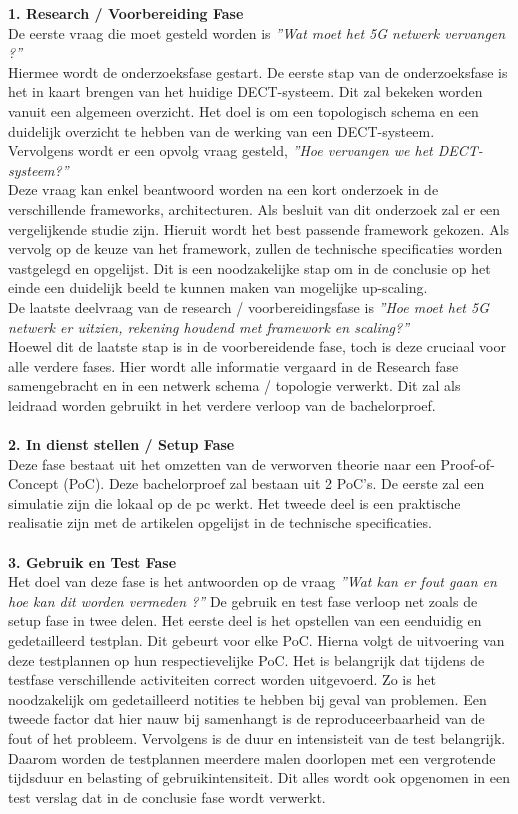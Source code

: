 \textbf{1. Research / Voorbereiding Fase}\\
De eerste vraag die moet gesteld worden is \textit{''Wat moet het 5G netwerk vervangen ?''} \\
Hiermee wordt de onderzoeksfase gestart. De eerste stap van de onderzoeksfase is het in kaart brengen van het huidige DECT-systeem. Dit zal bekeken worden vanuit een algemeen overzicht. Het doel is om een topologisch schema en een duidelijk overzicht te hebben van de werking van een DECT-systeem.\\
Vervolgens wordt er een opvolg vraag gesteld, \textit{''Hoe vervangen we het DECT-systeem?''}\\ Deze vraag kan enkel beantwoord worden na een kort onderzoek in de verschillende frameworks, architecturen. Als besluit van dit onderzoek zal er een vergelijkende studie zijn. Hieruit wordt het best passende framework gekozen.
Als vervolg op de keuze van het framework, zullen de technische specificaties worden vastgelegd en opgelijst. Dit is een noodzakelijke stap om in de conclusie op het einde een duidelijk beeld te kunnen maken van mogelijke up-scaling.\\
De laatste deelvraag van de research / voorbereidingsfase is \textit{''Hoe moet het 5G netwerk er uitzien, rekening houdend met framework en scaling?''}\\ Hoewel dit de laatste stap is in de voorbereidende fase, toch is deze cruciaal voor alle verdere fases. Hier wordt alle informatie vergaard in de Research fase samengebracht en in een netwerk schema / topologie verwerkt. Dit zal als leidraad worden gebruikt in het verdere verloop van de bachelorproef.\\\\
\textbf{2. In dienst stellen / Setup Fase}\\
Deze fase bestaat uit het omzetten van de verworven theorie naar een Proof-of-Concept (PoC). Deze bachelorproef zal bestaan uit 2 PoC's. De eerste zal een simulatie zijn die lokaal op de pc werkt. Het tweede deel is een praktische realisatie zijn met de artikelen opgelijst in de technische specificaties. \\\\
\textbf{3. Gebruik en Test Fase}\\
Het doel van deze fase is het antwoorden op de vraag \textit{''Wat kan er fout gaan en hoe kan dit worden vermeden ?''} De gebruik en test fase verloop net zoals de setup fase in twee delen. Het eerste deel is het opstellen van een eenduidig en gedetailleerd testplan. Dit gebeurt voor elke PoC. Hierna volgt de uitvoering van deze testplannen op hun respectievelijke PoC. Het is belangrijk dat tijdens de testfase verschillende activiteiten correct worden uitgevoerd. Zo is het noodzakelijk om gedetailleerd notities te hebben bij geval van problemen. Een tweede factor dat hier nauw bij samenhangt is de reproduceerbaarheid van de fout of het probleem. Vervolgens is de duur en intensisteit van de test belangrijk. Daarom worden de testplannen meerdere malen doorlopen met een vergrotende tijdsduur en belasting of gebruikintensiteit. Dit alles wordt ook opgenomen in een test verslag dat in de conclusie fase wordt verwerkt.\\\\
